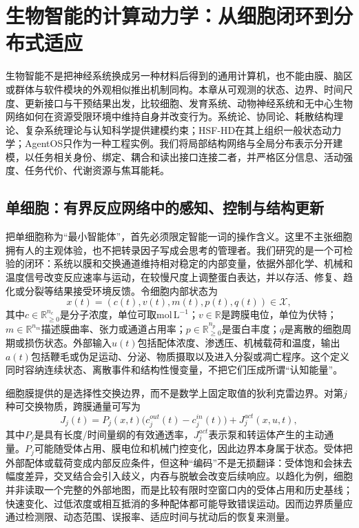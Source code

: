 \chapter{生物智能的计算动力学：从细胞闭环到分布式适应}
\label{chp:biological_intelligence}

生物智能不是把神经系统换成另一种材料后得到的通用计算机，也不能由膜、脑区或群体与软件模块的外观相似推出机制同构。本章从可观测的状态、边界、时间尺度、更新接口与干预结果出发，比较细胞、发育系统、动物神经系统和无中心生物网络如何在资源受限环境中维持自身并改变行为。系统论、协同论、耗散结构理论、复杂系统理论与认知科学提供建模约束；HSF-HD在其上组织一般状态动力学；AgentOS只作为一种工程实例。我们将局部结构网络与全局分布表示分开建模，以任务相关身份、绑定、耦合和读出接口连接二者，并严格区分信息、活动强度、任务代价、代谢资源与焦耳能耗。

\section{单细胞：有界反应网络中的感知、控制与结构更新}
\label{sec:single_cell_anatomy}

把单细胞称为“最小智能体”，首先必须限定智能一词的操作含义。这里不主张细胞拥有人的主观体验，也不把转录因子写成会思考的管理者。我们研究的是一个可检验的闭环：系统以膜和交换通道维持相对稳定的内部变量，依据外部化学、机械和温度信号改变反应速率与运动，在较慢尺度上调整蛋白表达，并以存活、修复、趋化或分裂等结果接受环境反馈。令细胞内部状态为
\begin{equation}
 x(t)=(c(t),v(t),m(t),p(t),q(t))\in\mathcal X,
\end{equation}
其中$c\in\mathbb R_{\geq0}^{n_c}$是分子浓度，单位可取$\mathrm{mol\,L^{-1}}$；$v\in\mathbb R$是跨膜电位，单位为伏特；$m\in\mathbb R^{n_m}$描述膜曲率、张力或通道占用率；$p\in\mathbb R_{\geq0}^{n_p}$是蛋白丰度；$q$是离散的细胞周期或损伤状态。外部输入$u(t)$包括配体浓度、渗透压、机械载荷和温度，输出$a(t)$包括鞭毛或伪足运动、分泌、物质摄取以及进入分裂或凋亡程序。这个定义同时容纳连续状态、离散事件和结构性慢变量，不把它们压成所谓“认知能量”。

细胞膜提供的是选择性交换边界，而不是数学上固定取值的狄利克雷边界。对第$j$种可交换物质，跨膜通量可写为
\begin{equation}
 J_j(t)=P_j(x,t)\bigl(c^{out}_j(t)-c^{in}_j(t)\bigr)+J^{act}_j(x,u,t),
\end{equation}
其中$P_j$是具有长度/时间量纲的有效通透率，$J^{act}_j$表示泵和转运体产生的主动通量。$P_j$可能随受体占用、膜电位和机械门控变化，因此边界本身属于状态。受体把外部配体或载荷变成内部反应条件，但这种“编码”不是无损翻译：受体饱和会抹去幅度差异，交叉结合会引入歧义，内吞与脱敏会改变后续响应。以趋化为例，细胞并非读取一个完整的外部地图，而是比较有限时空窗口内的受体占用和历史基线；快速变化、过低浓度或相互抵消的多种配体都可能导致错误运动。因而边界质量应通过检测限、动态范围、误报率、适应时间与扰动后的恢复来测量。

